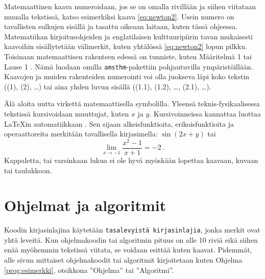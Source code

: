 Matemaattinen kaava numeroidaan, jos se on omalla rivillään ja siihen viitataan muualla tekstissä, katso esimerkiksi kaava \eqref{eq:newton2}. Usein numero on tavallisten sulkujen sisällä ja tasattu oikeaan laitaan, kuten tässä ohjeessa. Matematiikan kirjoitusohjeiden ja englatilaisen kulttuuripiirin tavan mukaisesti kaavoihin sisällytetään välimerkit, kuten yhtälössä \eqref{eq:newton2} lopun pilkku. Toisinaan matemaattisen rakenteen edessä on tunniste, kuten Määritelmä 1 tai Lause 1 \parencite{matohje2009}. Nämä luodaan omilla \texttt{amsthm}-pakettiin pohjautuvilla ympäristöillään. Kaavojen ja muiden rakenteiden numerointi voi olla juokseva läpi koko tekstin ((1), (2), \ldots) tai aina yhden luvun sisällä ((1.1), (1.2), \ldots, (2.1), \ldots).

Älä aloita uutta virkettä matemaattisella symbolilla. Yleensä teknis-fysikaalisessa tekstissä kursivoidaan muuttujat, kuten \(x\) ja \(y\). Kursivoinneissa kannattaa luottaa \LaTeX{}in automatiikkaan \parencite{notsoshort}. Sen sijaan alkeisfunktioita, erikoisfunktioita ja operaattoreita merkitään tavallisella kirjasimella: \(\sin(2x + y)\) tai
\begin{equation*}
    \lim_{x \rightarrow -1}\frac{x^2 - 1}{x + 1} = -2 \,.
\end{equation*}
Kappaletta, tai varsinkaan lukua ei ole hyvä myöskään lopettaa kaavaan, kuvaan tai taulukkoon.


\section{Ohjelmat ja algoritmit}

Koodin kirjasinlajina käytetään \texttt{tasalevyistä kirjasinlajia}, jonka merkit ovat yhtä leveitä. Kun ohjelmakoodin tai algoritmin pituus on alle 10 riviä eikä siihen enää myöhemmin tekstissä viitata, se voidaan esittää kuten kaavat. Pidemmät, alle sivun mittaiset ohjelmakoodit tai algoritmit kirjoitetaan kuten Ohjelma \ref{prog:esimerkki}, otsikkona ''Ohjelma'' tai ''Algoritmi''.

